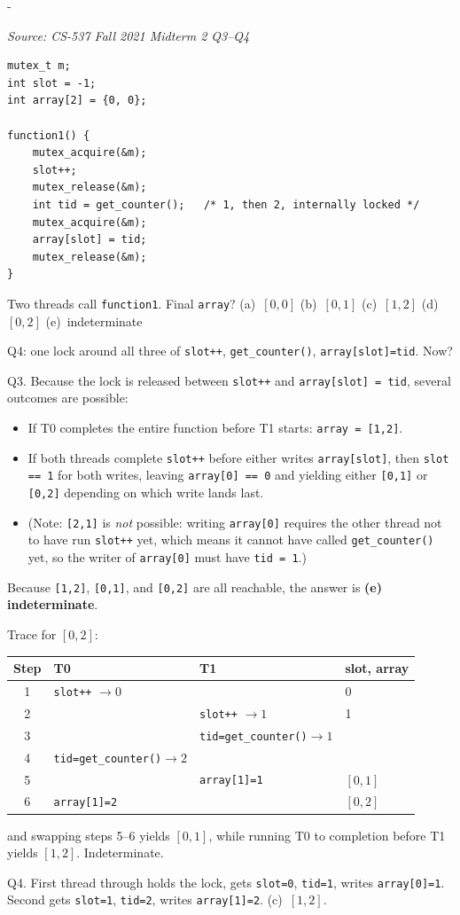\documentclass[11pt,a4paper]{article}
\makeatletter
\newcommand{\keepspace}[1]{\par\penalty-100\begingroup
  \setlength{\dimen@}{#1}\dimen@ii\pagegoal\advance\dimen@ii-\pagetotal
  \ifdim\dimen@>\dimen@ii\ifdim\dimen@ii>\z@\vfil\fi\break\fi\endgroup}
\newcounter{qn}[section]
\newenvironment{Qn}[4]{%
  \refstepcounter{qn}\keepspace{7\baselineskip}%
  \begin{tcolorbox}[qboxstyle, title={Q\thesection.\theqn\ \ [#1 \textbar\ #2]\ \ #4}]%
  {\footnotesize\color{g3}\textit{Source: #3}}\par\smallskip%
}{%
  \end{tcolorbox}%
}
\newenvironment{Sol}{%
  \begin{tcolorbox}[sboxstyle, title={Solution}]%
}{%
  \end{tcolorbox}\vspace{0.35em}%
}
\makeatother
\begin{document}
\begin{Qn}{Hard}{Lect 16}{CS-537 Fall 2021 Midterm 2 Q3--Q4}{Split lock around \texttt{slot++} and \texttt{array[slot]}}
\begin{lstlisting}[numbers=none]
mutex_t m;
int slot = -1;
int array[2] = {0, 0};

function1() {
    mutex_acquire(&m);
    slot++;
    mutex_release(&m);
    int tid = get_counter();   /* 1, then 2, internally locked */
    mutex_acquire(&m);
    array[slot] = tid;
    mutex_release(&m);
}
\end{lstlisting}

Two threads call \texttt{function1}. Final \texttt{array}?
(a)~$[0,0]$ (b)~$[0,1]$ (c)~$[1,2]$ (d)~$[0,2]$ (e)~indeterminate

Q4: one lock around all three of \texttt{slot++}, \texttt{get\_counter()}, \texttt{array[slot]=tid}. Now?
\end{Qn}
\begin{Sol}
Q3. Because the lock is released between \texttt{slot++} and \texttt{array[slot] = tid}, several outcomes are possible:
\begin{itemize}
  \item If T0 completes the entire function before T1 starts: \texttt{array = [1,2]}.
  \item If both threads complete \texttt{slot++} before either writes \texttt{array[slot]}, then \texttt{slot == 1} for both writes, leaving \texttt{array[0] == 0} and yielding either \texttt{[0,1]} or \texttt{[0,2]} depending on which write lands last.
  \item (Note: \texttt{[2,1]} is \emph{not} possible: writing \texttt{array[0]} requires the other thread not to have run \texttt{slot++} yet, which means it cannot have called \texttt{get\_counter()} yet, so the writer of \texttt{array[0]} must have \texttt{tid = 1}.)
\end{itemize}
Because \texttt{[1,2]}, \texttt{[0,1]}, and \texttt{[0,2]} are all reachable, the answer is \textbf{(e) indeterminate}.

Trace for $[0,2]$:
\begin{center}
\begin{tabular}{c|l|l|l}
Step & T0 & T1 & slot, array \\
\hline
1 & \texttt{slot++} $\to 0$ & & 0 \\
2 & & \texttt{slot++} $\to 1$ & 1 \\
3 & & \texttt{tid=get\_counter()}$\to1$ & \\
4 & \texttt{tid=get\_counter()}$\to2$ & & \\
5 & & \texttt{array[1]=1} & $[0,1]$ \\
6 & \texttt{array[1]=2} & & $[0,2]$ \\
\end{tabular}
\end{center}
and swapping steps 5--6 yields $[0,1]$, while running T0 to completion before T1 yields $[1,2]$. Indeterminate.

Q4. First thread through holds the lock, gets \texttt{slot=0}, \texttt{tid=1}, writes \texttt{array[0]=1}. Second gets \texttt{slot=1}, \texttt{tid=2}, writes \texttt{array[1]=2}. (c)~$[1,2]$.
\end{Sol}
\end{document}
